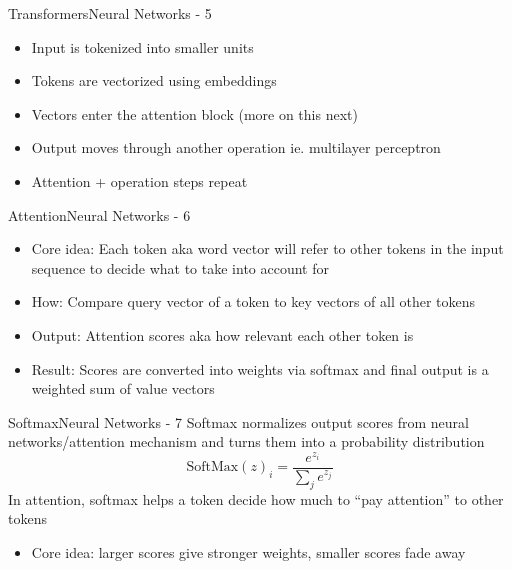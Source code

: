 \documentclass{beamer}
\begin{document}
\begin{frame}{Transformers}{Neural Networks - 5}
	\begin{itemize}
		\item Input is tokenized into smaller units
		\item Tokens are vectorized using embeddings
		\item Vectors enter the attention block (more on this next)
		\item Output moves through another operation ie. multilayer perceptron
		\item Attention + operation steps repeat 
	\end{itemize}
\end{frame}

\begin{frame}{Attention}{Neural Networks - 6}
	\begin{itemize}
		\item Core idea: Each token aka word vector will refer to other tokens in the input sequence to decide what to take into account for
		\item How: Compare query vector of a token to key vectors of all other tokens
		\item Output: Attention scores aka how relevant each other token is
		\item Result: Scores are converted into weights via softmax and final output is a weighted sum of value vectors
	\end{itemize}
\end{frame}

\begin{frame}{Softmax}{Neural Networks - 7}
	Softmax normalizes output scores from neural networks/attention mechanism and turns them into a probability distribution      
	\[\text{SoftMax}(z)_i = \frac{e^{z_i}}{\sum_j e^{z_j}}\]
	In attention, softmax helps a token decide how much to “pay attention” to other tokens
	\begin{itemize}
		\item Core idea: larger scores give stronger weights, smaller scores fade away
	\end{itemize}
\end{frame}
\end{document}
